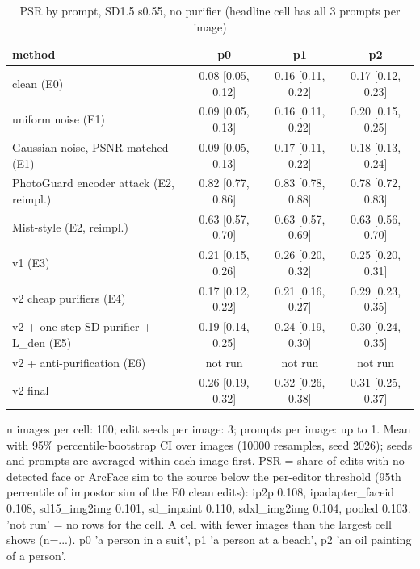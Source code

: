 \begin{table}[t]
\centering
\small
\begin{tabular}{lccc}
\toprule
method & p0 & p1 & p2 \\
\midrule
clean (E0) & 0.08 [0.05, 0.12] & 0.16 [0.11, 0.22] & 0.17 [0.12, 0.23] \\
uniform noise (E1) & 0.09 [0.05, 0.13] & 0.16 [0.11, 0.22] & 0.20 [0.15, 0.25] \\
Gaussian noise, PSNR-matched (E1) & 0.09 [0.05, 0.13] & 0.17 [0.11, 0.22] & 0.18 [0.13, 0.24] \\
PhotoGuard encoder attack (E2, reimpl.) & 0.82 [0.77, 0.86] & 0.83 [0.78, 0.88] & 0.78 [0.72, 0.83] \\
Mist-style (E2, reimpl.) & 0.63 [0.57, 0.70] & 0.63 [0.57, 0.69] & 0.63 [0.56, 0.70] \\
v1 (E3) & 0.21 [0.15, 0.26] & 0.26 [0.20, 0.32] & 0.25 [0.20, 0.31] \\
v2 cheap purifiers (E4) & 0.17 [0.12, 0.22] & 0.21 [0.16, 0.27] & 0.29 [0.23, 0.35] \\
v2 + one-step SD purifier + L\_den (E5) & 0.19 [0.14, 0.25] & 0.24 [0.19, 0.30] & 0.30 [0.24, 0.35] \\
v2 + anti-purification (E6) & not run & not run & not run \\
v2 final & 0.26 [0.19, 0.32] & 0.32 [0.26, 0.38] & 0.31 [0.25, 0.37] \\
\bottomrule
\end{tabular}
\caption{PSR by prompt, SD1.5 s0.55, no purifier (headline cell has all 3 prompts per image)}
\label{tab:per_prompt}
\par\footnotesize n images per cell: 100; edit seeds per image: 3; prompts per image: up to 1. Mean with 95\% percentile-bootstrap CI over images (10000 resamples, seed 2026); seeds and prompts are averaged within each image first. PSR = share of edits with no detected face or ArcFace sim to the source below the per-editor threshold (95th percentile of impostor sim of the E0 clean edits): ip2p 0.108, ipadapter\_faceid 0.108, sd15\_img2img 0.101, sd\_inpaint 0.110, sdxl\_img2img 0.104, pooled 0.103. 'not run' = no rows for the cell. A cell with fewer images than the largest cell shows (n=...). p0 'a person in a suit', p1 'a person at a beach', p2 'an oil painting of a person'.
\end{table}
